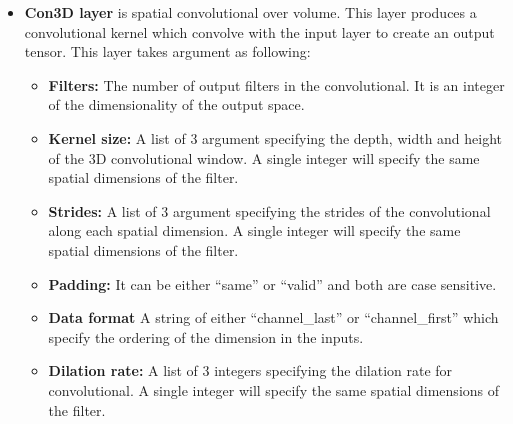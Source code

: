 \begin{itemize}
    \item \textbf{Con3D layer} is spatial convolutional over volume. This layer produces a convolutional kernel which convolve with the input layer to create an output tensor. This layer takes argument as following:\\
    \noindent{}
    \begin{itemize}
        \item \textbf{Filters:} The number of output filters in the convolutional. It is an integer of the dimensionality of the output space. 
        \item \textbf{Kernel size:} A list of 3 argument specifying the depth, width and height of the 3D convolutional window. A single integer will specify the same spatial dimensions of the filter.
        \item \textbf{Strides:} A list of 3 argument specifying the strides of the convolutional along each spatial dimension. A single integer will specify the same spatial dimensions of the filter.
        \item \textbf{Padding:} It can be either “same” or “valid” and both are case sensitive.
        \item \textbf{Data format} A string of either “channel\_last” or “channel\_first” which specify the ordering of the dimension in the inputs. 
        \item \textbf{Dilation rate:} A list of 3 integers specifying the dilation rate for convolutional. A single integer will specify the same spatial dimensions of the filter.

\end{itemize}
\end{itemize}
